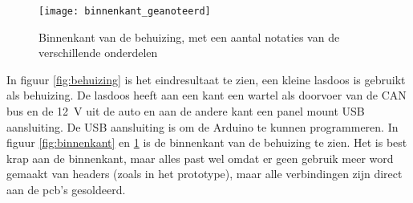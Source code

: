 \begin{figure}[]
    \centering
    \texttt{[image: binnenkant\_geanoteerd]}
    \caption{Binnenkant van de behuizing, met een aantal notaties van de verschillende onderdelen}
    \label{fig:binnenkant_geanoteerd}
\end{figure}

In figuur \ref{fig:behuizing} is het eindresultaat te zien, een kleine lasdoos
is gebruikt als behuizing. De lasdoos heeft aan een kant een wartel als
doorvoer van de CAN bus en de \si{12\volt} uit de auto en aan de andere kant
een panel mount USB aansluiting. De USB aansluiting is om de Arduino te kunnen
programmeren. In figuur \ref{fig:binnenkant} en \ref{fig:binnenkant_geanoteerd} is de binnenkant van de behuizing
te zien. Het is best krap aan de binnenkant, maar alles past wel omdat er geen
gebruik meer word gemaakt van headers (zoals in het prototype), maar alle
verbindingen zijn direct aan de pcb's gesoldeerd.